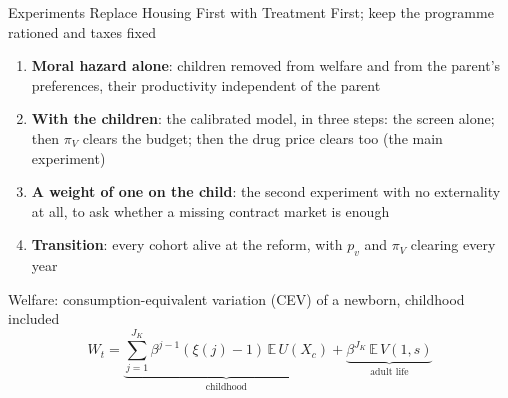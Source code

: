 \documentclass[aspectratio=169,11pt]{beamer}
\newcommand{\HF}{Housing First}
\newcommand{\TF}{Treatment First}
\begin{document}
\begin{frame}{Experiments}
Replace \HF{} with \TF{}; keep the programme rationed and taxes fixed
\begin{enumerate}\setlength\itemsep{0.35em}
\item \textbf{Moral hazard alone}: children removed from welfare and from the parent's preferences, their productivity independent of the parent
\item \textbf{With the children}: the calibrated model, in three steps: the screen alone; then $\pi_V$ clears the budget; then the drug price clears too (the main experiment)
\item \textbf{A weight of one on the child}: the second experiment with no externality at all, to ask whether a missing contract market is enough
\item \textbf{Transition}: every cohort alive at the reform, with $p_v$ and $\pi_V$ clearing every year
\end{enumerate}
\vspace{0.1cm}
Welfare: consumption-equivalent variation (CEV) of a newborn, childhood included
\[
W_t=\underbrace{\textstyle\sum_{j=1}^{J_K}\beta^{j-1}(\xi(j)-1)\,\mathbb{E}\,U(X_c)}_{\text{childhood}}+\underbrace{\beta^{J_K}\,\mathbb{E}\,V(1,s)}_{\text{adult life}}
\]
\end{frame}
\end{document}
